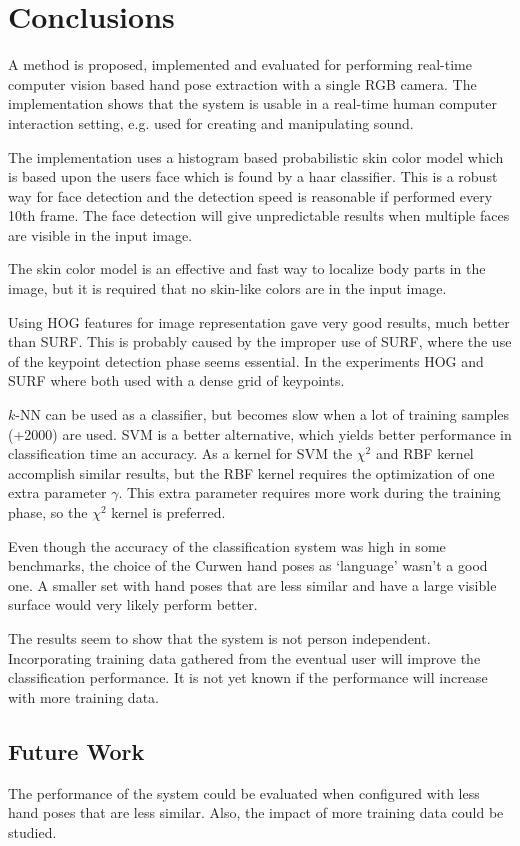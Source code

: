 
\chapter{Conclusions}
\label{ch:conc}
A method is proposed, implemented and evaluated for performing real-time computer vision based hand pose extraction with a single RGB camera. The implementation shows that the system is usable in a real-time human computer interaction setting, e.g. used for creating and manipulating sound.

The implementation uses a histogram based probabilistic skin color model which is based upon the users face which is found by a haar classifier. This is a robust way for face detection and the detection speed is reasonable if performed every 10th frame. The face detection will give unpredictable results when multiple faces are visible in the input image.

The skin color model is an effective and fast way to localize body parts in the image, but it is required that no skin-like colors are in the input image. 

Using HOG features for image representation gave very good results, much better than SURF. This is probably caused by the improper use of SURF, where the use of the keypoint detection phase seems essential. In the experiments HOG and SURF where both used with a dense grid of keypoints.

$k$-NN can be used as a classifier, but becomes slow when a lot of training samples (+2000) are used. SVM is a better alternative, which yields better performance in classification time an accuracy. As a kernel for SVM the $\chi^2$ and RBF kernel accomplish similar results, but the RBF kernel requires the optimization of one extra parameter $\gamma$. This extra parameter requires more work during the training phase, so the $\chi^2$ kernel is preferred.

Even though the accuracy of the classification system was high in some benchmarks, the choice of the Curwen hand poses as `language' wasn't a good one. A smaller set with hand poses that are less similar and have a large visible surface would very likely perform better.

The results seem to show that the system is not person independent. Incorporating training data gathered from the eventual user will improve the classification performance. It is not yet known if the performance will increase with more training data.

\section{Future Work}
The performance of the system could be evaluated when configured with less hand poses that are less similar. Also, the impact of more training data could be studied.